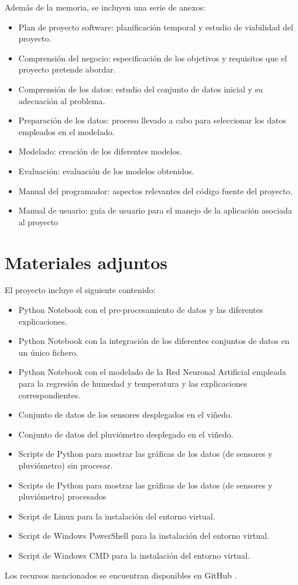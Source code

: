 Además de la memoria, se incluyen una serie de anexos:
\begin{itemize}
    \item Plan de proyecto software: planificación temporal y estudio de viabilidad del proyecto.
    \item Comprensión del negocio: especificación de los objetivos y requisitos que el proyecto pretende abordar.
    \item Comprensión de los datos: estudio del conjunto de datos inicial y su adecuación al problema.
    \item Preparación de los datos: proceso llevado a cabo para seleccionar los datos empleados en el modelado.
    \item Modelado: creación de los diferentes modelos.
    \item Evaluación: evaluación de los modelos obtenidos.
    \item Manual del programador: aspectos relevantes del código fuente del proyecto.
    \item Manual de usuario: guía de usuario para el manejo de la aplicación asociada al proyecto
\end{itemize}

\section{Materiales adjuntos}
El proyecto incluye el siguiente contenido:
\begin{itemize}
    \item Python Notebook con el pre-procesamiento de datos y las diferentes explicaciones.
    \item Python Notebook con la integración de los diferentes conjuntos de datos en un único fichero.
    \item Python Notebook con el modelado de la Red Neuronal Artificial empleada para la regresión
        de humedad y temperatura y las explicaciones correspondientes.
    \item Conjunto de datos de los sensores desplegados en el viñedo.
    \item Conjunto de datos del pluviómetro desplegado en el viñedo.
    \item Scripts de Python para mostrar las gráficas de los datos (de sensores y pluviómetro) sin procesar.
    \item Scripts de Python para mostrar las gráficas de los datos (de sensores y pluviómetro) procesados
    \item Script de Linux para la instalación del entorno virtual.
    \item Script de Windows PowerShell para la instalación del entorno virtual.
    \item Script de Windows CMD para la instalación del entorno virtual.
\end{itemize}
Los recursos mencionados se encuentran disponibles en GitHub \cite{gabriel:2023}.
